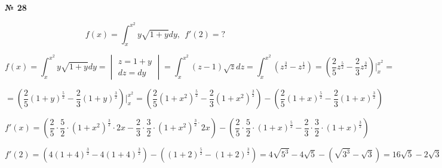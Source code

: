 \documentclass{article}
\begin{document}
\textbf{№ 28} 

$$ f(x) = \int_{x}^{x^2} y\sqrt{1+y} dy, \ \ f'(2) = ? $$ 

$$ f(x)
= \int_{x}^{x^2} y\sqrt{1+y} dy
= \begin{vmatrix} z = 1+y \\
                 dz = dy \end{vmatrix}
= \int_{x}^{x^2} (z-1) \sqrt{z} dz
= \int_{x}^{x^2} \left( z^{\frac{3}{2}} - z^{\frac{1}{2}} \right)
= \left( \frac{2}{5} z^{\frac{5}{2}} - \frac{2}{3} z^{\frac{3}{2}} \right) \bigg\vert_{x}^{x^2} 
= $$

$$ = \left( \frac{2}{5} (1+y)^{\frac{5}{2}} - \frac{2}{3} (1+y)^{\frac{3}{2}} \right) \bigg\vert_{x}^{x^2} 
= \left( \frac{2}{5} (1+x^2)^{\frac{5}{2}} - \frac{2}{3} (1+x^2)^{\frac{3}{2}} \right) - \left( \frac{2}{5} (1+x)^{\frac{5}{2}} - \frac{2}{3} (1+x)^{\frac{3}{2}} \right) $$

$$ f'(x) 
= \left( \frac{2}{5} \cdot \frac{5}{2} \cdot (1+x^2)^{\frac{3}{2}} \cdot 2x - \frac{2}{3} \cdot \frac{3}{2} \cdot (1+x^2)^{\frac{3}{2} \cdot }2x \right) - \left( \frac{2}{5} \cdot \frac{5}{2} \cdot (1+x)^{\frac{5}{2}} - \frac{2}{3} \cdot \frac{3}{2} \cdot (1+x)^{\frac{3}{2}} \right) $$

$$ f'(2)
= \left( 4(1+4)^{\frac{3}{2}} - 4(1+4)^{\frac{3}{2}} \right) - \left( (1+2)^{\frac{5}{2}} - (1+2)^{\frac{3}{2}} \right) 
= 4\sqrt{5^3} - 4\sqrt{5} - \left( \sqrt{3^3} - \sqrt{3} \right) 
= 16\sqrt{5} - 2\sqrt{3} $$
\end{document}
